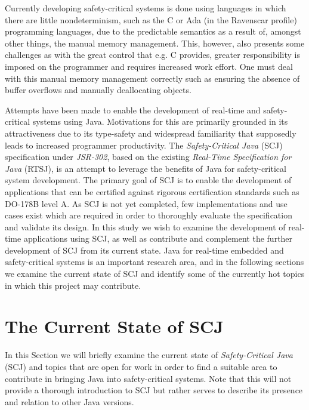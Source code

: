 Currently developing safety-critical systems is done using languages in which there are little nondeterminism, such as the C or Ada (in the Ravenscar profile) programming languages, due to the predictable semantics as a result of, amongst other things, the manual memory management. This, however, also presents some challenges as with the great control that e.g. C provides, greater responsibility is imposed on the programmer and requires increased work effort. One must deal with this manual memory management correctly such as ensuring the absence of buffer overflows and manually deallocating objects.

Attempts have been made to enable the development of real-time and safety-critical systems using Java. Motivations for this are primarily grounded in its attractiveness due to its type-safety and widespread familiarity that supposedly leads to increased programmer productivity\cite{henties:2009-20, Nilsen96issuesin}.
The \textit{Safety-Critical Java} (SCJ) specification under \textit{JSR-302}\cite{JSR, SCJSpec}, based on the existing \textit{Real-Time Specification for Java} (RTSJ), is an attempt to leverage the benefits of Java for safety-critical system development. The primary goal of SCJ is to enable the development of applications that can be certified against rigorous certification standards such as DO-178B level A. As SCJ is not yet completed, few implementations and use cases exist which are required in order to thoroughly evaluate the specification and validate its design.
In this study we wish to examine the development of real-time applications using SCJ, as well as contribute and complement the further development of SCJ from its current state. Java for real-time embedded and safety-critical systems is an important research area, and in the following sections we examine the current state of SCJ and identify some of the currently hot topics in which this project may contribute.

\section{The Current State of SCJ}
In this Section we will briefly examine the current state of \textit{Safety-Critical Java} (SCJ) and topics that are open for work in order to find a suitable area to contribute in bringing Java into safety-critical systems. Note that this will not provide a thorough introduction to SCJ but rather serves to describe its presence and relation to other Java versions.

